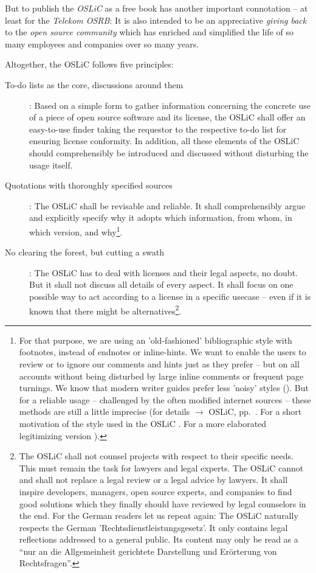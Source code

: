 But to publish the \emph{OSLiC} as a free book has another important connotation --
at least for the \emph{Telekom OSRB}: It is also intended to be an appreciative
\emph{giving back} to the \emph{open source community} which has enriched and
simplified the life of so many employees and companies over so many years.

Altogether, the OSLiC follows five principles:

\begin{description}
  \item[To-do lists as the core, discussions around them]: Based on a simple
  form to gather information concerning the concrete use of a piece of open
  source software and its license, the OSLiC shall offer an easy-to-use finder
  taking the requestor to the respective to-do list for ensuring license
  conformity. In addition, all these elements of the OSLiC should comprehensibly
  be introduced and discussed without disturbing the usage itself.

  \item[Quotations with thoroughly specified sources]\label{QuotationPrinciple}:
  The OSLiC shall be revisable and reliable. It shall comprehensibly argue and
  explicitly specify why it adopts which information, from whom, in which
  version, and why\footnote{For that purpose, we are using an 'old-fashioned'
  bibliographic style with footnotes, instead of endnotes or inline-hints.
  We want to enable the users to review or to ignore our comments and hints just
  as they prefer -- but on all accounts without being disturbed by large inline
  comments or frequent page turnings. We know that modern writer guides prefer
  less 'noisy' styles (\cite[pars pro toto cf.][\nopage passim]{Mla2009a}). But
  for a reliable usage -- challenged by the often modified internet sources --
  these methods are still a little imprecise (for details $\rightarrow$ OSLiC,
  pp.\ \pageref{sec:QuotationAppendix}. For a short motivation of the style used
  in the OSLiC \cite[cf.][\nopage passim]{Reincke2012a}. For a more elaborated
  legitimizing version \cite[cf.][\nopage passim]{Reincke2012b}).}.

  \item[No clearing the forest, but cutting a swath]: The OSLiC has to deal with
  licenses and their legal aspects, no doubt. But it shall not discuss all
  details of every aspect. It shall focus on one possible way to act according
  to a license in a specific usecase -- even if it is known that there might be
  alternatives\footnote{The OSLiC shall not counsel projects with respect to
  their specific needs. This must remain the task for lawyers and legal experts.
  The OSLiC cannot and shall not replace a legal review or a legal advice by
  lawyers. It shall inspire developers, managers, open source experts, and
  companies to find good solutions which they finally should have reviewed by
  legal counselors in the end. For the German readers let us repeat again: The
  OSLiC naturally respects the German 'Rechtsdienstleistungsgesetz'. It only
  contains legal reflections addressed to a general public. Its content may only
  be read as a \enquote{nur an die Allgemeinheit gerichtete Darstellung und
  Erörterung von Rechtsfragen}.}.
  

\end{description}

